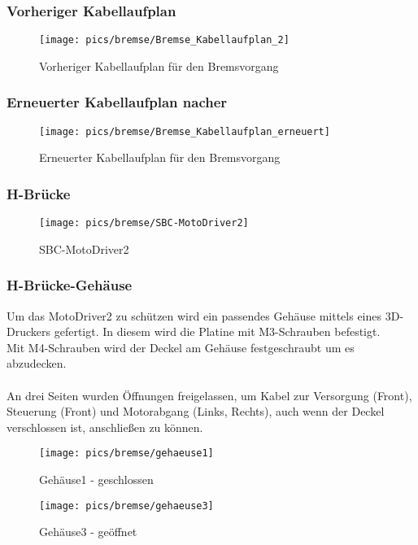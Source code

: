 \documentclass[12pt,a4paper]{article}
\begin{document}
\subsubsection*{Vorheriger Kabellaufplan}
\begin{figure}[h!]
	\centering	
	\texttt{[image: pics/bremse/Bremse\_Kabellaufplan\_2]}
	\caption{Vorheriger Kabellaufplan für den Bremsvorgang}
\end{figure}
\newpage
\subsubsection*{Erneuerter Kabellaufplan nacher}
\begin{figure}[h!]
	\centering	
	\texttt{[image: pics/bremse/Bremse\_Kabellaufplan\_erneuert]}
	\caption{Erneuerter Kabellaufplan für den Bremsvorgang}
\end{figure}
%
%
\newpage
\subsubsection*{H-Brücke}
\begin{figure}[h!]
	\centering
	\texttt{[image: pics/bremse/SBC-MotoDriver2]}
	\caption{SBC-MotoDriver2}
\end{figure}
%
%
\newpage
\subsubsection*{H-Brücke-Gehäuse}
Um das MotoDriver2 zu schützen wird ein passendes Gehäuse mittels eines 3D-Druckers gefertigt. 
In diesem wird die Platine mit M3-Schrauben befestigt. \\
Mit M4-Schrauben wird der Deckel am Gehäuse festgeschraubt um es abzudecken. \\\\
%
An drei Seiten wurden Öffnungen freigelassen, um Kabel zur Versorgung (Front), Steuerung (Front) und 
Motorabgang (Links, Rechts), auch wenn der Deckel verschlossen ist, anschlie\ss en zu können. \\
%
\begin{figure}[h!]
	\centering
	\texttt{[image: pics/bremse/gehaeuse1]}
	\caption{Gehäuse1 - geschlossen}
\end{figure}
\begin{figure}[h!]
	\centering
	\texttt{[image: pics/bremse/gehaeuse3]}
	\caption{Gehäuse3 - geöffnet}
\end{figure}
%
%
\newpage
\end{document}
